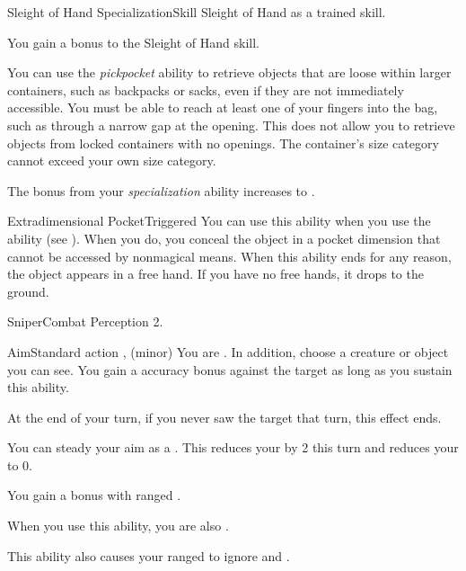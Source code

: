   \begin{feat}{Sleight of Hand Specialization}{Skill}
    \featpre Sleight of Hand as a trained skill.

     You gain a  bonus to the Sleight of Hand skill.

     You can use the \textit{pickpocket} ability to retrieve objects that are loose within larger containers, such as backpacks or sacks, even if they are not immediately accessible.
    You must be able to reach at least one of your fingers into the bag, such as through a narrow gap at the opening.
    This does not allow you to retrieve objects from locked containers with no openings.
    The container's size category cannot exceed your own size category.

     The bonus from your \textit{specialization} ability increases to .

    \begin{magicalattuneability}{Extradimensional Pocket}{Triggered}
      \abilitytags {}
      \rankline
      You can use this ability when you use the  ability (see ).
      When you do,  you conceal the object in a pocket dimension that cannot be accessed by nonmagical means.
      When this ability ends for any reason, the object appears in a free hand.
      If you have no free hands, it drops to the ground.
    \end{magicalattuneability}
  \end{feat}

  \begin{feat}{Sniper}{Combat}
    \featpre Perception 2.

    \begin{sustainability}{Aim}{Standard action}
      \abilitytags {},  (minor)
      \rankline
      You are \briefly \focused.
      In addition, choose a creature or object you can see.
      You gain a  accuracy bonus against the target as long as you sustain this ability.

      At the end of your turn, if you never saw the target that turn, this effect ends.
    \end{sustainability}

     You can steady your aim as a .
    This reduces your  by 2 this turn and reduces your  to 0.

     You gain a   bonus with ranged .

     When you use this ability, you are also \briefly \honed.

     This ability also causes your ranged  to ignore  and .
  \end{feat}

